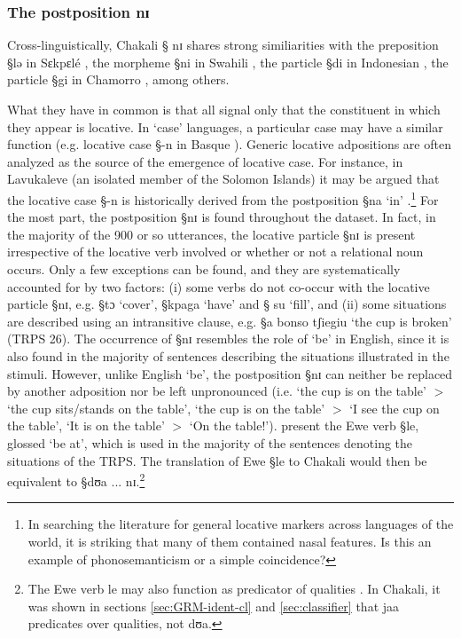 \subsubsection{The postposition {\I nɪ}}
\label{sec:SPA-postp}

Cross-linguistically,  Chakali  {\S
nɪ} shares strong similiarities with the preposition  {\S lə} 
in Sɛkpɛlé
\citep[1071]{Amek07c},
the morpheme {\S ni} in Swahili \citep{Knap67}, the particle {\S di} in
Indonesian \citep[112-114]{MacD76}, the particle  {\S gi} in Chamorro
\citep[116-119]{Topp73}, among others. 


What they have in common is that all  signal only that the
constituent in which they appear is locative. In `case' languages, a particular
case may have a similar function (e.g. locative case {\S -n} in Basque
\citep[2]{Ibar10}). Generic locative adpositions are often analyzed as the
source
of the emergence of locative case. For instance, in Lavukaleve (an isolated
member of the Solomon Islands) it may be argued that the   locative case {\S -n}
 is historically
derived from the postposition {\S na} `in' \citep[see][161]{Terr03}.\footnote{In
 searching the literature  for general locative markers across
languages of the world, it is striking that many of them contained  nasal
features. Is this an example of phonosemanticism or a simple coincidence?} For
the
most part, the postposition {\S nɪ} is found  throughout   the dataset.  In
fact, in the majority of the 900 or so utterances,  the locative
particle {\S nɪ} is present irrespective of the
locative verb involved or whether or not a relational noun occurs. Only a  few
exceptions can be found,   and they are
systematically accounted for by two factors: (i) some verbs  do not co-occur
with
the locative particle {\S nɪ}, e.g. {\S tɔ} `cover', {\S kpaga} `have' and {\S
su} `fill',  and (ii) some situations are described using an intransitive
clause, e.g.   {\S a bonso tʃiegiu}   `the cup is broken' (TRPS 26).   The
 occurrence of {\S nɪ}  resembles the role of  `be' in English, since it is
also
found in the majority of sentences describing the situations illustrated in the
stimuli. However, unlike English `be', the postposition  {\S nɪ} can neither be
replaced by another adposition nor be left unpronounced (i.e. `the cup is on the
table'  $>$   `the cup sits/stands on the table', `the cup is on the table'  $>$
 `I see the cup on the table',  `It is on the table' $>$  `On the table!').
\citet[370]{Amek06} present the Ewe verb {\S le}, glossed  `be at',  which is
used in the majority of the sentences denoting the situations of the TRPS.   The
translation of  Ewe {\S le} to Chakali would then be equivalent to {\S dʊa ...
nɪ}.\footnote{The Ewe verb {\F le} may also function as predicator of qualities
\citep[373]{Amek06}. In Chakali,  it was shown  in sections
\ref{sec:GRM-ident-cl} and \ref{sec:classifier} that   {\F
jaa} predicates over qualities,  not  {\F dʊa}.}



